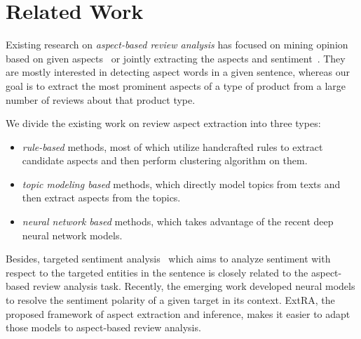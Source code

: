 \section{Related Work}
\label{sec:related}
Existing research on \textit{aspect-based review analysis} 
has focused on mining opinion based on given aspects~\cite{su2008hidden,zeng2013classification,rana2017improving,poria2016aspect,tubishat2018implicit} or jointly extracting the aspects and 
sentiment~\cite{lin2009joint,zhao2010jointly,wang2015sentiment,liu2016improving,DBLP:journals/corr/WangPDX16,wu2018hybrid,wang2017coupled}. 
They are mostly interested in detecting aspect words in a given sentence, 
whereas our goal is to extract the most prominent aspects of a type of
product from a large number of reviews about that product type.

We divide the existing work on review aspect extraction into three types:
\begin{itemize}
	\item \textit{rule-based} methods, most of which utilize 
	handcrafted rules to extract candidate aspects
	and then perform clustering algorithm on them.
	\item \textit{topic modeling based} methods, which directly model 
	topics from texts and then extract aspects from the topics.
	\item \textit{neural network based} methods, which takes advantage
	of the recent deep neural network models.
\end{itemize}

Besides, targeted sentiment analysis~\cite{dong2014adaptive, tang2015effective} which aims to analyze sentiment with respect to the targeted entities in the sentence is 
closely related to the aspect-based review analysis task.
Recently, the emerging work \cite{ma2018targeted, liu2018recurrent}
developed neural models to resolve the sentiment polarity of a given target in its context.
ExtRA, the proposed framework of aspect extraction and inference,
makes it easier to adapt those models to aspect-based review analysis.

